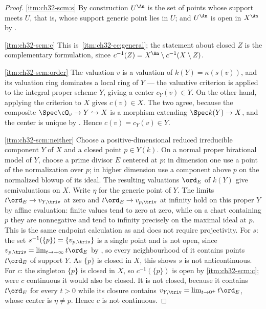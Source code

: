\begin{proof}
\cref{itm:ch32-scm:s}  By construction $U^{\An}$ is the set of points whose
support meets $U$, that is, whose support generic point lies in $U$; and
$U^{\An}$ is open in $X^{\An}$ by .

\cref{itm:ch32-scm:c}  This is
\,\cref{itm:ch32-cc:general}; the statement
about closed $Z$ is the complementary formulation, since
$c^{-1}(Z)=X^{\An}\setminus c^{-1}(X\setminus Z)$.

\cref{itm:ch32-scm:order}  The valuation $v$ is a valuation of
$k(Y)=\kappa(s(v))$, and its valuation ring dominates a local ring of
$Y$ --- the valuative criterion is applied to the integral proper scheme
$Y$, giving a center $c_Y(v)\in Y$.  On the other hand, applying the
criterion to $X$ gives $c(v)\in X$.  The two agree, because the
composite $\Spec\cO_v\to Y\hookrightarrow X$ is a morphism extending
$\Spec k(Y)\to X$, and the center is unique by
.  Hence $c(v)=c_Y(v)\in Y$.

\cref{itm:ch32-scm:neither}  Choose a positive-dimensional reduced
irreducible component $Y$ of $X$ and a closed point $p\in Y(k)$.
On a normal proper birational model of $Y$, choose a prime divisor $E$
centered at $p$: in dimension one use a point of the normalization over
$p$; in higher dimension use a component above $p$ on the normalized
blowup of its ideal.  The resulting valuations $\ord_E$ of $k(Y)$
give semivaluations on $X$.  Write $\eta$ for the generic point of $Y$.
The limits $t\ord_E\to v_{Y,\triv}$ at zero and
$t\ord_E\to v_{p,\triv}$ at infinity hold on this proper $Y$ by affine
evaluation: finite values tend to zero at zero, while on a chart containing
$p$ they are nonnegative and tend to infinity precisely on the maximal
ideal at $p$.  This is the same endpoint calculation as
 and does not require projectivity.
For $s$: the set
$s^{-1}(\{p\})=\{v_{p,\triv}\}$ is a single point and is not open, since
$v_{p,\triv}=\lim_{t\to+\infty}t\ord_E$ by
, so every neighbourhood of it contains
points $t\ord_E$ of support $Y$.  As $\{p\}$ is closed in $X$, this
shows $s$ is not anticontinuous.  For $c$: the singleton $\{p\}$ is
closed in $X$, so $c^{-1}(\{p\})$ is open by \cref{itm:ch32-scm:c}; were
$c$ continuous it would also be closed.  It is not closed, because it
contains $t\ord_E$ for every $t>0$ while its closure contains
$v_{Y,\triv}=\lim_{t\to0^+}t\ord_E$, whose center is $\eta\neq p$.
Hence $c$ is not continuous.
\end{proof}

